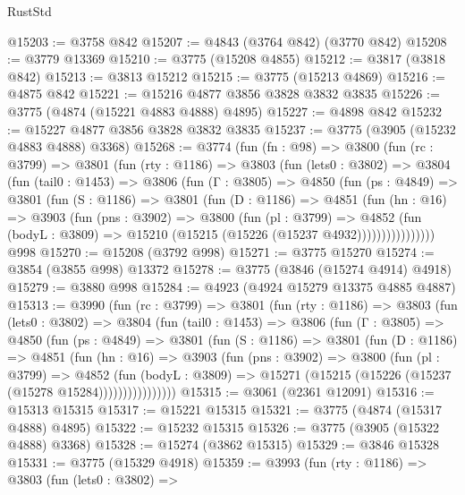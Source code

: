 \begin{lexlean}{RustStd}
\begin{coremodule}
@15203 := @3758 @842
@15207 := @4843 (@3764 @842) (@3770 @842)
@15208 := @3779 @13369
@15210 := @3775 (@15208 @4855)
@15212 := @3817 (@3818 @842)
@15213 := @3813 @15212
@15215 := @3775 (@15213 @4869)
@15216 := @4875 @842
@15221 := @15216 @4877 @3856 @3828 @3832 @3835
@15226 := @3775 (@4874 (@15221 @4883 @4888) @4895)
@15227 := @4898 @842
@15232 := @15227 @4877 @3856 @3828 @3832 @3835
@15237 := @3775 (@3905 (@15232 @4883 @4888) @3368)
@15268 := @3774
    (fun (fn : @98) =>
    @3800
      (fun (rc : @3799) =>
      @3801
        (fun (rty : @1186) =>
        @3803
          (fun (lets0 : @3802) =>
          @3804
            (fun (tail0 : @1453) =>
            @3806
              (fun (Γ : @3805) =>
              @4850
                (fun (ps : @4849) =>
                @3801
                  (fun (S : @1186) =>
                  @3801
                    (fun (D : @1186) =>
                    @4851
                      (fun (hn : @16) =>
                      @3903
                        (fun (pns : @3902) =>
                        @3800
                          (fun (pl : @3799) =>
                          @4852
                            (fun (bodyL : @3809) =>
                            @15210 (@15215 (@15226 (@15237 @4932))))))))))))))))
    @998
@15270 := @15208 (@3792 @998)
@15271 := @3775 @15270
@15274 := @3854 (@3855 @998) @13372
@15278 := @3775 (@3846 (@15274 @4914) @4918)
@15279 := @3880 @998
@15284 := @4923 (@4924 @15279 @13375 @4885 @4887)
@15313 := @3990
    (fun (rc : @3799) =>
    @3801
      (fun (rty : @1186) =>
      @3803
        (fun (lets0 : @3802) =>
        @3804
          (fun (tail0 : @1453) =>
          @3806
            (fun (Γ : @3805) =>
            @4850
              (fun (ps : @4849) =>
              @3801
                (fun (S : @1186) =>
                @3801
                  (fun (D : @1186) =>
                  @4851
                    (fun (hn : @16) =>
                    @3903
                      (fun (pns : @3902) =>
                      @3800
                        (fun (pl : @3799) =>
                        @4852
                          (fun (bodyL : @3809) =>
                          @15271 (@15215 (@15226 (@15237 (@15278 @15284))))))))))))))))
@15315 := @3061 (@2361 @12091)
@15316 := @15313 @15315
@15317 := @15221 @15315
@15321 := @3775 (@4874 (@15317 @4888) @4895)
@15322 := @15232 @15315
@15326 := @3775 (@3905 (@15322 @4888) @3368)
@15328 := @15274 (@3862 @15315)
@15329 := @3846 @15328
@15331 := @3775 (@15329 @4918)
@15359 := @3993
    (fun (rty : @1186) =>
    @3803
      (fun (lets0 : @3802) =>

\end{coremodule}
\end{lexlean}
